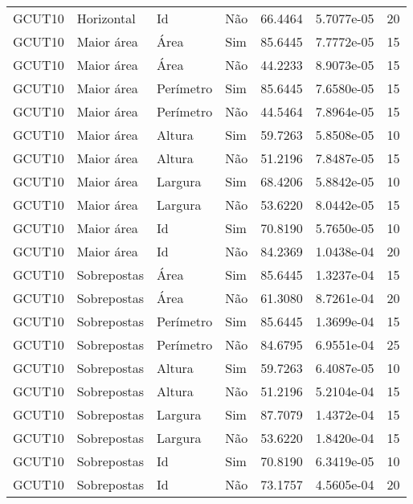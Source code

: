 \begin{tabular}{llllrrr}
GCUT10    & Horizontal  & Id        & Não         & 66.4464      & 5.7077e-05 & 20       \\
GCUT10    & Maior área  & Área      & Sim         & 85.6445      & 7.7772e-05 & 15       \\
GCUT10    & Maior área  & Área      & Não         & 44.2233      & 8.9073e-05 & 15       \\
GCUT10    & Maior área  & Perímetro & Sim         & 85.6445      & 7.6580e-05 & 15       \\
GCUT10    & Maior área  & Perímetro & Não         & 44.5464      & 7.8964e-05 & 15       \\
GCUT10    & Maior área  & Altura    & Sim         & 59.7263      & 5.8508e-05 & 10       \\
GCUT10    & Maior área  & Altura    & Não         & 51.2196      & 7.8487e-05 & 15       \\
GCUT10    & Maior área  & Largura   & Sim         & 68.4206      & 5.8842e-05 & 10       \\
GCUT10    & Maior área  & Largura   & Não         & 53.6220      & 8.0442e-05 & 15       \\
GCUT10    & Maior área  & Id        & Sim         & 70.8190      & 5.7650e-05 & 10       \\
GCUT10    & Maior área  & Id        & Não         & 84.2369      & 1.0438e-04 & 20       \\
GCUT10    & Sobrepostas & Área      & Sim         & 85.6445      & 1.3237e-04 & 15       \\
GCUT10    & Sobrepostas & Área      & Não         & 61.3080      & 8.7261e-04 & 20       \\
GCUT10    & Sobrepostas & Perímetro & Sim         & 85.6445      & 1.3699e-04 & 15       \\
GCUT10    & Sobrepostas & Perímetro & Não         & 84.6795      & 6.9551e-04 & 25       \\
GCUT10    & Sobrepostas & Altura    & Sim         & 59.7263      & 6.4087e-05 & 10       \\
GCUT10    & Sobrepostas & Altura    & Não         & 51.2196      & 5.2104e-04 & 15       \\
GCUT10    & Sobrepostas & Largura   & Sim         & 87.7079      & 1.4372e-04 & 15       \\
GCUT10    & Sobrepostas & Largura   & Não         & 53.6220      & 1.8420e-04 & 15       \\
GCUT10    & Sobrepostas & Id        & Sim         & 70.8190      & 6.3419e-05 & 10       \\
GCUT10    & Sobrepostas & Id        & Não         & 73.1757      & 4.5605e-04 & 20       \\
\hline
\end{tabular}